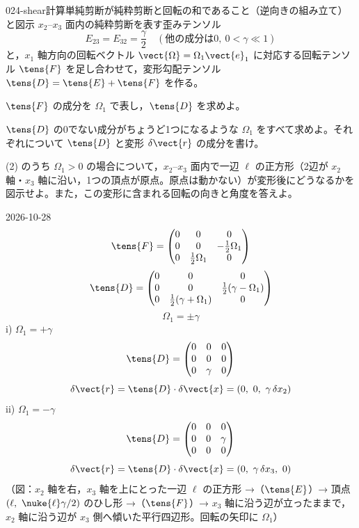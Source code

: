 \documentclass[uplatex,dvipdfmx,a4paper,11pt]{jsarticle}
\begin{document}
\begin{mondai}{024-shear}{計算}{単純剪断が純粋剪断と回転の和であること（逆向きの組み立て）と図示}
$x_2$--$x_3$ 面内の純粋剪断を表す歪みテンソル
  \[ E_{23}=E_{32}=\frac{\gamma}{2}\quad(\text{他の成分は}0,\ 0<\gamma\ll1) \]
  と，$x_1$ 軸方向の回転ベクトル $\vect{\Omega}=\Omega_1\vect{e}_1$ に対応する回転テンソル $\tens{F}$ を足し合わせて，変形勾配テンソル $\tens{D}=\tens{E}+\tens{F}$ を作る。
  \begin{shoumon}
    \item $\tens{F}$ の成分を $\Omega_1$ で表し，$\tens{D}$ を求めよ。
    \item $\tens{D}$ の0でない成分がちょうど1つになるような $\Omega_1$ をすべて求めよ。それぞれについて $\tens{D}$ と変形 $\delta\vect{r}$ の成分を書け。
    \item (2) のうち $\Omega_1>0$ の場合について，$x_2$--$x_3$ 面内で一辺 $\ell$ の正方形（2辺が $x_2$ 軸・$x_3$ 軸に沿い，1つの頂点が原点。原点は動かない）が変形後にどうなるかを図示せよ。また，この変形に含まれる回転の向きと角度を答えよ。
  \end{shoumon}
\begin{kotaeutsushi}{2026-10-28}
\[ \tens{F}=\begin{pmatrix}0&0&0\\0&0&-\frac{1}{2}\Omega_{1}\\0&\frac{1}{2}\Omega_{1}&0\end{pmatrix} \]
\[ \tens{D}=\begin{pmatrix}0&0&0\\0&0&\frac{1}{2}(\gamma-\Omega_{1})\\0&\frac{1}{2}(\gamma+\Omega_{1})&0\end{pmatrix} \]
\[ \Omega_{1}=\pm\gamma \]
i) $\Omega_{1}=+\gamma$
\[ \tens{D}=\begin{pmatrix}0&0&0\\0&0&0\\0&\gamma&0\end{pmatrix} \]
\[ \delta\vect{r}=\tens{D}\cdot\delta\vect{x}=(0,\ 0,\ \gamma\,\delta x_{2}) \]
ii) $\Omega_{1}=-\gamma$
\[ \tens{D}=\begin{pmatrix}0&0&0\\0&0&\gamma\\0&0&0\end{pmatrix} \]
\[ \delta\vect{r}=\tens{D}\cdot\delta\vect{x}=(0,\ \gamma\,\delta x_{3},\ 0) \]
（図：$x_{2}$ 軸を右，$x_{3}$ 軸を上にとった一辺 $\ell$ の正方形 →（$\tens{E}$）→ 頂点 $(\ell,\ \nuke{\ell}\gamma/2)$ のひし形 →（$\tens{F}$）→ $x_{3}$ 軸に沿う辺が立ったままで，$x_{2}$ 軸に沿う辺が $x_{3}$ 側へ傾いた平行四辺形。回転の矢印に $\Omega_{1}$）


\end{kotaeutsushi}
\end{mondai}
\end{document}
